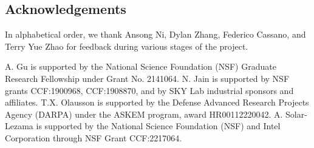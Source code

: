 \subsection{Acknowledgements}
In alphabetical order, we thank Ansong Ni, Dylan Zhang, Federico Cassano, and Terry Yue Zhao for feedback during various stages of the project.

A. Gu is supported by the National Science Foundation (NSF) Graduate Research Fellowship under Grant No. 2141064. 
N. Jain is supported by NSF grants CCF:1900968, CCF:1908870, and by SKY Lab industrial sponsors and affiliates. 
T.X. Olausson is supported by the Defense Advanced Research Projects Agency (DARPA) under the ASKEM program, award HR00112220042. 
A. Solar-Lezama is supported by the National Science Foundation (NSF) and Intel Corporation through NSF Grant CCF:2217064.